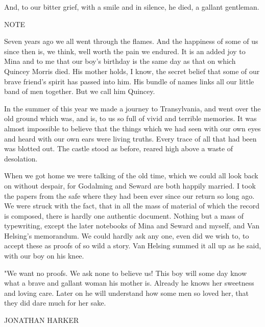 And, to our bitter grief, with a smile and in silence, he died, a gallant gentleman. 

NOTE 

Seven years ago we all went through the flames. And the happiness of some of us since then is, we think, well worth the pain we endured. It is an added joy to Mina and to me that our boy's birthday is the same day as that on which Quincey Morris died. His mother holds, I know, the secret belief that some of our brave friend's spirit has passed into him. His bundle of names links all our little band of men together. But we call him Quincey. 

In the summer of this year we made a journey to Transylvania, and went over the old ground which was, and is, to us so full of vivid and terrible memories. It was almost impossible to believe that the things which we had seen with our own eyes and heard with our own ears were living truths. Every trace of all that had been was blotted out. The castle stood as before, reared high above a waste of desolation. 

When we got home we were talking of the old time, which we could all look back on without despair, for Godalming and Seward are both happily married. I took the papers from the safe where they had been ever since our return so long ago. We were struck with the fact, that in all the mass of material of which the record is composed, there is hardly one authentic document. Nothing but a mass of typewriting, except the later notebooks of Mina and Seward and myself, and Van Helsing's memorandum. We could hardly ask any one, even did we wish to, to accept these as proofs of so wild a story. Van Helsing summed it all up as he said, with our boy on his knee. 

"We want no proofs. We ask none to believe us! This boy will some day know what a brave and gallant woman his mother is. Already he knows her sweetness and loving care. Later on he will understand how some men so loved her, that they did dare much for her sake. 

JONATHAN HARKER 
